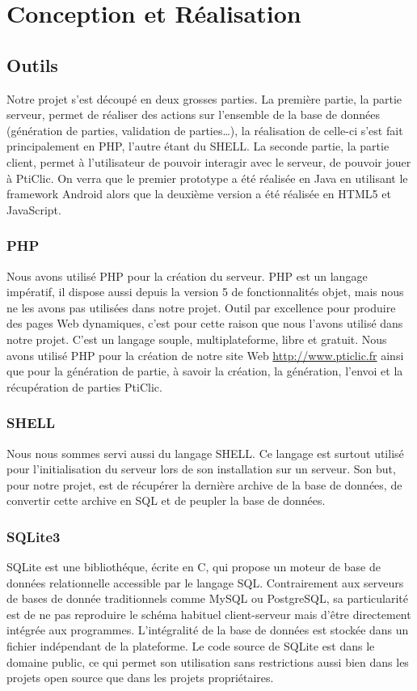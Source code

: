 \documentclass[a4paper,11pt,french]{article}
\def\android{Android\texttrademark{}}
\begin{document}
\pagebreak

\section{Conception et Réalisation}

\subsection{Outils}

Notre projet s'est découpé en deux grosses parties. La première partie, la \og{}partie serveur\fg{}, permet de réaliser des actions sur l'ensemble de la base de données (génération de parties, validation de parties\ldots),
la réalisation de celle-ci s'est fait principalement en PHP, l'autre étant du SHELL.
La seconde partie, la \og{}partie client\fg{}, permet à l'utilisateur de pouvoir interagir avec le serveur, de pouvoir jouer à PtiClic. On verra que le premier prototype a été réalisée en Java en utilisant le framework \android{} alors   que la deuxième version a été réalisée en HTML5 et JavaScript.

\subsubsection{PHP}
Nous avons utilisé PHP pour la création du serveur. PHP est un langage impératif, il dispose aussi depuis la version 5 de fonctionnalités objet, mais nous ne les avons pas utilisées dans notre projet. Outil par excellence pour produire des pages Web dynamiques, c'est pour cette raison que nous l'avons utilisé dans notre projet. C'est un langage souple, multiplateforme, libre et gratuit.
Nous avons utilisé PHP pour la création de notre site Web \url{http://www.pticlic.fr} ainsi que pour la génération de partie, à savoir la création, la génération, l'envoi et la récupération de parties PtiClic.

\subsubsection{SHELL}
Nous nous sommes servi aussi du langage SHELL. Ce langage est surtout utilisé pour l'initialisation du serveur lors de son installation sur un serveur. Son but, pour notre projet, est de récupérer la dernière archive de la base de données, de convertir cette archive en SQL et de peupler la base de données.

\subsubsection{SQLite3}
SQLite est une bibliothéque, écrite en C, qui propose un moteur de base de données relationnelle accessible par le langage SQL. Contrairement aux serveurs de bases de donnée traditionnels comme MySQL ou PostgreSQL, sa particularité est de ne pas reproduire le schéma habituel client-serveur mais d'être directement intégrée aux programmes. L'intégralité de la base de données est stockée dans un fichier indépendant de la plateforme. Le code source de SQLite est dans le domaine public, ce qui permet son utilisation sans restrictions aussi bien dans les projets open source que dans les projets propriétaires.
\end{document}
